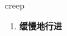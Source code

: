 
\begin{frame}
{\huge creep}
\begin{center}
\begin{enumerate}\Large
  \item \textbf{缓慢地行进}
\end{enumerate}
\end{center}
\end{frame}
